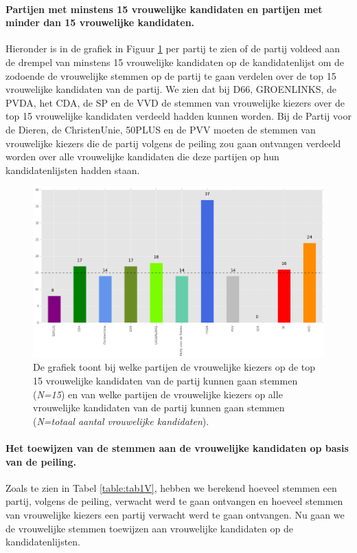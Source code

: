 \paragraph{Partijen met minstens 15 vrouwelijke kandidaten en partijen met minder dan 15 vrouwelijke kandidaten.}
Hieronder is in de grafiek in Figuur \ref{fig:15V} per partij te zien of de partij voldeed aan de drempel van minstens 15 vrouwelijke kandidaten op de kandidatenlijst om de zodoende de vrouwelijke stemmen op de partij te gaan verdelen over de top 15 vrouwelijke kandidaten van de partij. We zien dat bij D66, GROENLINKS, de PVDA, het CDA, de SP en de VVD de stemmen van vrouwelijke kiezers over de top 15 vrouwelijke kandidaten verdeeld hadden kunnen worden. Bij de Partij voor de Dieren, de ChristenUnie, 50PLUS en de PVV moeten de stemmen van vrouwelijke kiezers die de partij volgens de peiling zou gaan ontvangen verdeeld worden over alle vrouwelijke kandidaten die deze partijen op hun kandidatenlijsten hadden staan.

\begin{figure}[H]

	\includegraphics[width=\linewidth]	{top15_of_topN_kandidaten.png}

			\caption{De grafiek toont bij welke partijen de vrouwelijke kiezers op de top 15 vrouwelijke kandidaten van de partij kunnen gaan stemmen (\textit{N=15}) en van welke partijen de vrouwelijke kiezers op alle vrouwelijke kandidaten van de partij kunnen gaan stemmen (\textit{N=totaal aantal vrouwelijke kandidaten}).}  

\label{fig:15V}
\end{figure}

\paragraph{Het toewijzen van de stemmen aan de vrouwelijke kandidaten op basis van de peiling.}
Zoals te zien in Tabel \ref{table:tab1V}, hebben we berekend hoeveel stemmen een partij, volgens de peiling, verwacht werd te gaan ontvangen en hoeveel stemmen van vrouwelijke kiezers een partij verwacht werd te gaan ontvangen. Nu gaan we de vrouwelijke stemmen toewijzen aan vrouwelijke kandidaten op de kandidatenlijsten. 

